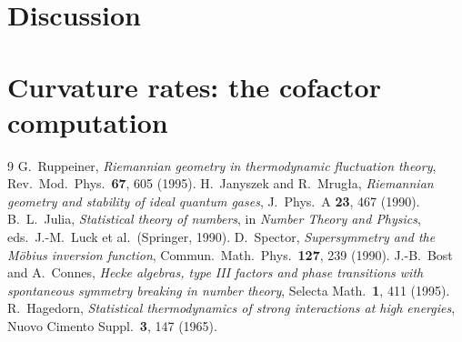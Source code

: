 \documentclass[a4paper,11pt]{article}
\theoremstyle{plain}
\theoremstyle{definition}
\theoremstyle{remark}
\begin{document}
\section{Discussion}\label{sec:disc}

\appendix
\section{Curvature rates: the cofactor computation}\label{app:rates}

\begin{thebibliography}{9}
 G.~Ruppeiner, \emph{Riemannian geometry in thermodynamic fluctuation theory},
   Rev.\ Mod.\ Phys.\ \textbf{67}, 605 (1995).
 H.~Janyszek and R.~Mrug{\l}a, \emph{Riemannian geometry and stability of ideal
   quantum gases}, J.\ Phys.\ A \textbf{23}, 467 (1990).
 B.~L.~Julia, \emph{Statistical theory of numbers}, in \emph{Number Theory and
   Physics}, eds.\ J.-M.~Luck et al.\ (Springer, 1990).
 D.~Spector, \emph{Supersymmetry and the M\"obius inversion function},
   Commun.\ Math.\ Phys.\ \textbf{127}, 239 (1990).
 J.-B.~Bost and A.~Connes, \emph{Hecke algebras, type III factors and phase
   transitions with spontaneous symmetry breaking in number theory}, Selecta Math.\ \textbf{1}, 411 (1995).
 R.~Hagedorn, \emph{Statistical thermodynamics of strong interactions at high
   energies}, Nuovo Cimento Suppl.\ \textbf{3}, 147 (1965).
\end{thebibliography}
\end{document}
